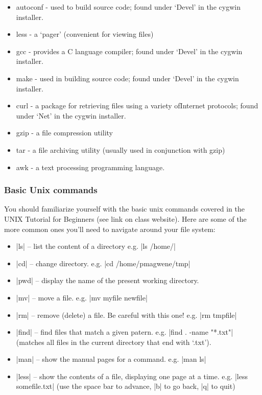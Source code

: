 \begin{itemize}
    \item autoconf - used to build source code; found under `Devel' in the cygwin installer.
    \item less - a `pager' (convenient for viewing files)
    \item gcc - provides a C language compiler; found under `Devel' in the cygwin installer.
    \item make - used in building source code; found under `Devel' in the cygwin installer.
    \item curl - a package for retrieving files using a variety ofInternet protocols; found under `Net' in the cygwin installer.
    \item gzip - a file compression utility
    \item tar - a file archiving utility (usually used in conjunction with gzip)
    \item awk - a text processing programming language.
\end{itemize}

\subsubsection{Basic Unix commands}

You should familiarize yourself with the basic unix commands covered in the UNIX Tutorial for Beginners (see link on class website).  Here are some of the more common ones you'll need to navigate around your file system:

\begin{itemize}
\item |ls| -- list the content of a directory e.g. |ls /home/|
\item |cd| -- change directory.  e.g. |cd /home/pmagwene/tmp|
\item |pwd| -- display the name of the present working directory.
\item |mv| -- move a file. e.g. |mv myfile newfile|
\item |rm| -- remove (delete) a file. Be careful with this one! e.g. |rm tmpfile|
\item |find| -- find files that match a given patern. e.g. |find . -name "*.txt"| (matches all files in the current directory that end with `.txt').
\item |man| -- show the manual pages for a command. e.g. |man ls|
\item |less| -- show the contents of a file, displaying one page at a time. e.g. |less somefile.txt| (use the space bar to advance, |b| to go back, |q| to quit)
\end{itemize}


